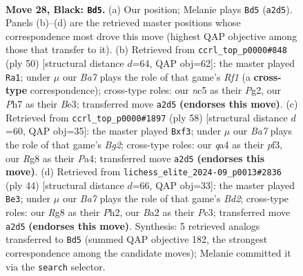 \documentclass[11pt]{article}
\begin{document}
\clearpage

\begin{figure}[p]\centering
\begin{subfigure}{0.46\textwidth}\centering
\resizebox{\linewidth}{!}{%
\newchessgame
\chessboard[
  setfen={r1k3r1/p1q2p1p/2p5/2N5/Q7/3P4/b4PPP/2R3K1 b - - 2 28},
  showmover=false,
  pgfstyle=straightmove, color=movearrow, markmove={a2-d5}
]}
\caption{}
\end{subfigure}\hfill
\begin{subfigure}{0.46\textwidth}\centering
\resizebox{\linewidth}{!}{%
\newchessgame
\chessboard[
  setfen={2r3k1/5ppp/4p2n/Pq6/5P2/4B2Q/1P4PP/5R1K w - - 1 26},
  showmover=false,
  pgfstyle=straightmove, color=movearrow, markmove={f1-a1}
]}
\caption{}
\end{subfigure}
\\[4pt]
\begin{subfigure}{0.46\textwidth}\centering
\resizebox{\linewidth}{!}{%
\newchessgame
\chessboard[
  setfen={3r2k1/p4p2/2Q5/2P1q1n1/P7/5p1P/1P3PB1/R5K1 w - - 0 30},
  showmover=false,
  pgfstyle=straightmove, color=movearrow, markmove={g2-f3}
]}
\caption{}
\end{subfigure}\hfill
\begin{subfigure}{0.46\textwidth}\centering
\resizebox{\linewidth}{!}{%
\newchessgame
\chessboard[
  setfen={5r1k/ppp3pp/8/n7/3PQ3/2P5/1q1B1PPP/4R1K1 w - - 0 23},
  showmover=false,
  pgfstyle=straightmove, color=movearrow, markmove={d2-e3}
]}
\caption{}
\end{subfigure}
\caption{\textbf{Move 28, Black: \texttt{Bd5}.} (a) Our position; Melanie plays \texttt{Bd5} (\texttt{a2d5}). Panels (b)--(d) are the retrieved master positions whose correspondence most drove this move (highest QAP objective among those that transfer to it). (b) Retrieved from \texttt{ccrl\_top\_p0000\#848} (ply 50) [structural distance $d$=64, QAP obj=62]: the master played \texttt{Ra1}; under $\mu$ our \emph{Ba7} plays the role of that game's \emph{Rf1} (a \textbf{cross-type} correspondence); cross-type roles: our \emph{n}c5 as their \emph{P}g2, our \emph{P}h7 as their \emph{B}e3; transferred move \texttt{a2d5} \textbf{(endorses this move)}. (c) Retrieved from \texttt{ccrl\_top\_p0000\#1897} (ply 58) [structural distance $d$=60, QAP obj=35]: the master played \texttt{Bxf3}; under $\mu$ our \emph{Ba7} plays the role of that game's \emph{Bg2}; cross-type roles: our \emph{q}a4 as their \emph{p}f3, our \emph{R}g8 as their \emph{P}a4; transferred move \texttt{a2d5} \textbf{(endorses this move)}. (d) Retrieved from \texttt{lichess\_elite\_2024-09\_p0013\#2836} (ply 44) [structural distance $d$=66, QAP obj=33]: the master played \texttt{Be3}; under $\mu$ our \emph{Ba7} plays the role of that game's \emph{Bd2}; cross-type roles: our \emph{R}g8 as their \emph{P}h2, our \emph{B}a2 as their \emph{P}c3; transferred move \texttt{a2d5} \textbf{(endorses this move)}. Synthesis: 5 retrieved analogs transferred to \texttt{Bd5} (summed QAP objective 182, the strongest correspondence among the candidate moves); Melanie committed it via the \texttt{search} selector.}
\label{fig:thought-m55}
\end{figure}
\end{document}
